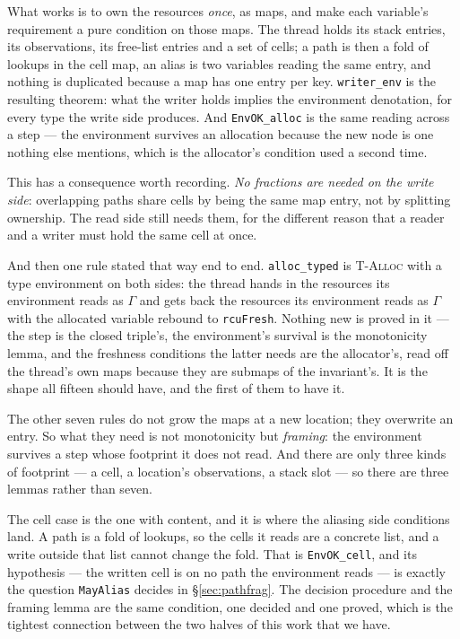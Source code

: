 What works is to own the resources \emph{once}, as maps, and make each
variable's requirement a pure condition on those maps.  The thread holds its
stack entries, its observations, its free-list entries and a set of cells; a
path is then a fold of lookups in the cell map, an alias is two variables
reading the same entry, and nothing is duplicated because a map has one entry
per key.  \texttt{writer\_env} is the resulting theorem: what the writer holds
implies the environment denotation, for every type the write side produces.  And
\texttt{EnvOK\_alloc} is the same reading across a step --- the environment
survives an allocation because the new node is one nothing else mentions, which
is the allocator's condition used a second time.

This has a consequence worth recording.  \emph{No fractions are needed on the
write side}: overlapping paths share cells by being the same map entry, not by
splitting ownership.  The read side still needs them, for the different reason
that a reader and a writer must hold the same cell at once.

And then one rule stated that way end to end.  \texttt{alloc\_typed} is
\textsc{T-Alloc} with a type environment on both sides: the thread hands in the
resources its environment reads as $\Gamma$ and gets back the resources its
environment reads as $\Gamma$ with the allocated variable rebound to
\texttt{rcuFresh}.  Nothing new is proved in it --- the step is the closed
triple's, the environment's survival is the monotonicity lemma, and the
freshness conditions the latter needs are the allocator's, read off the thread's
own maps because they are submaps of the invariant's.  It is the shape all
fifteen should have, and the first of them to have it.

The other seven rules do not grow the maps at a new location; they overwrite an
entry.  So what they need is not monotonicity but \emph{framing}: the
environment survives a step whose footprint it does not read.  And there are
only three kinds of footprint --- a cell, a location's observations, a stack
slot --- so there are three lemmas rather than seven.

The cell case is the one with content, and it is where the aliasing side
conditions land.  A path is a fold of lookups, so the cells it reads are a
concrete list, and a write outside that list cannot change the fold.  That is
\texttt{EnvOK\_cell}, and its hypothesis --- the written cell is on no path the
environment reads --- is exactly the question \texttt{MayAlias} decides in
\S\ref{sec:pathfrag}.  The decision procedure and the framing lemma are the
same condition, one decided and one proved, which is the tightest connection
between the two halves of this work that we have.

